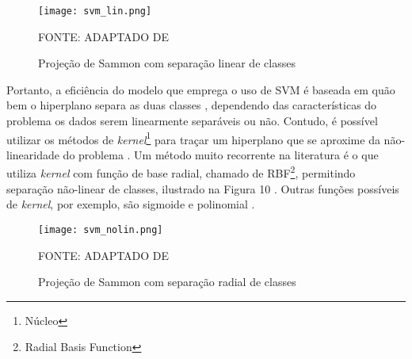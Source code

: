 \documentclass[12pt,oneside,a4paper,chapter=TITLE,section=TITLE,sumario=tradicional,english,brazil]{abntex2}
\begin{document}
\par
\begin{figure}[ht!]
\centering
\caption{Projeção de Sammon com separação linear de classes}
\par
\texttt{[image: svm\_lin.png]}
\par 
\centering
FONTE: ADAPTADO DE \cite{sammon1969}

\end{figure}
\par 
Portanto, a eficiência do modelo que emprega o uso de SVM é baseada em quão bem o hiperplano separa as duas classes \cite{haykin2009}, dependendo das características do problema os dados serem linearmente separáveis ou não. Contudo, é possível utilizar os métodos de \textit{kernel}\footnote{Núcleo} para traçar um hiperplano que se aproxime da não-linearidade do problema \cite{haykin2009}. Um método muito recorrente na literatura é o que utiliza \textit{kernel} com função de base radial, chamado de RBF\footnote{Radial Basis Function}, permitindo separação não-linear de classes, ilustrado na Figura 10 \cites{kalyani2011}{gharehpetian2008}. Outras funções possíveis de \textit{kernel}, por exemplo, são sigmoide e polinomial \cite{haykin2009}.\par 
\begin{figure}[ht!]
\centering
\caption{Projeção de Sammon com separação radial de classes}
\par
\texttt{[image: svm\_nolin.png]}
\par 
\centering
FONTE: ADAPTADO DE \cite{sammon1969}

\end{figure}
\par
\newpage 
\end{document}
